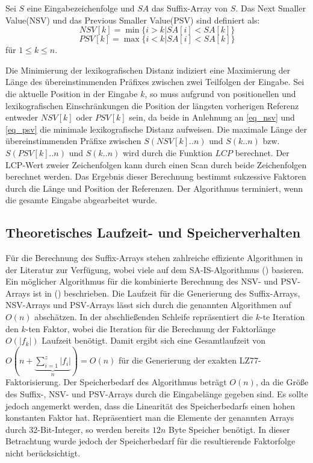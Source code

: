 Sei $S$ eine Eingabezeichenfolge und $SA$ das Suffix-Array von $S$. Das Next Smaller Value(NSV) und das Previous Smaller Value(PSV) sind definiert als:
\begin{equation} \label{eq_nsv}
    NSV[k] = \min\{i > k | SA[i] < SA[k]\}
\end{equation}
\begin{equation} \label{eq_psv}
    PSV[k] = \max\{i < k | SA[i] < SA[k]\}
\end{equation}
für $1\leq k \leq n$.

Die Minimierung der lexikografischen Distanz indiziert eine Maximierung der Länge des übereinstimmenden Präfixes zwischen zwei Teilfolgen der Eingabe.
Sei die aktuelle Position in der Eingabe $k$, so muss aufgrund von positionellen und lexikografischen Einschränkungen die 
Position der längsten vorherigen Referenz entweder $NSV[k]$ oder $PSV[k]$ sein, da beide in Anlehnung an \ref{eq_nsv} und \ref{eq_psv} die
minimale lexikografische Distanz aufweisen. Die maximale Länge der übereinstimmenden Präfixe zwischen $S(NSV[k]..n)$ und $S(k..n)$ bzw. $S(PSV[k]..n)$ 
und $S(k..n)$ wird durch die Funktion $LCP$ berechnet. Der LCP-Wert zweier Zeichenfolgen kann durch einen Scan durch beide
Zeichenfolgen berechnet werden. Das Ergebnis dieser Berechnung bestimmt sukzessive Faktoren durch die Länge und Position der Referenzen. Der Algorithmus 
terminiert, wenn die gesamte Eingabe abgearbeitet wurde.

\subsection{Theoretisches Laufzeit- und Speicherverhalten}
Für die Berechnung des Suffix-Arrays stehen zahlreiche effiziente Algorithmen in der Literatur zur Verfügung, wobei viele auf dem SA-IS-Algorithmus 
(\cite{sais}) basieren. Ein möglicher Algorithmus für die kombinierte Berechnung des NSV- und PSV-Arrays ist in (\cite{nsvpsv}) beschrieben. Die Laufzeit für
die Generierung des Suffix-Arrays, NSV-Arrays und PSV-Arrays lässt sich durch die genannten Algorithmen auf $O(n)$ abschätzen. In der abschließenden 
Schleife repräsentiert die $k$-te Iteration den $k$-ten Faktor, wobei die Iteration für die Berechnung der Faktorlänge $O(|f_k|)$ Laufzeit benötigt. 
Damit ergibt sich eine Gesamtlaufzeit von $O(n +\underbrace{\sum_{i=1}^{z} |f_i|}_{n}) = O(n)$ für die Generierung der exakten LZ77-Faktorisierung.
Der Speicherbedarf des Algorithmus beträgt $O(n)$, da die Größe des Suffix-, NSV- und PSV-Arrays durch die Eingabelänge gegeben sind. Es sollte jedoch
angemerkt werden, dass die Linearität des Speicherbedarfs einen hohen konstanten Faktor hat. Repräsentiert man die Elemente der genannten Arrays durch 32-Bit-Integer,
so werden bereits $12n$ Byte Speicher benötigt. In dieser Betrachtung wurde jedoch der Speicherbedarf für die resultierende Faktorfolge nicht berücksichtigt.


